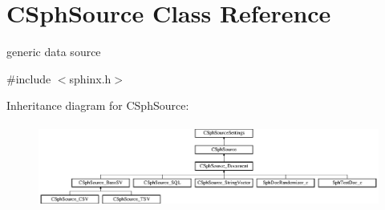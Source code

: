 \hypertarget{classCSphSource}{\section{C\-Sph\-Source Class Reference}
\label{classCSphSource}
}


generic data source  




{\ttfamily \#include $<$sphinx.\-h$>$}

Inheritance diagram for C\-Sph\-Source\-:\begin{figure}[H]
\begin{center}
\leavevmode
\includegraphics[height=2.745098cm]{classCSphSource}
\end{center}
\end{figure}
